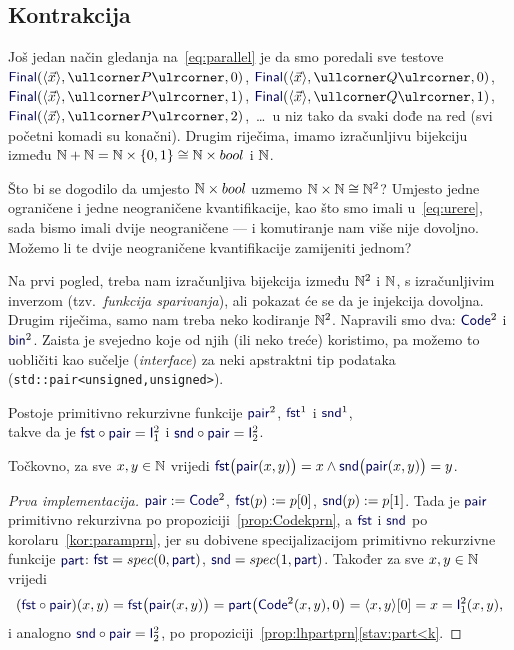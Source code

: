 \subsection{Kontrakcija}

Još jedan način gledanja na~\eqref{eq:parallel} je da smo poredali sve testove $\f{Final}(\kr{\vec x},\kprog P,0)$, $\f{Final}(\kr{\vec x},\kprog Q,0)$, $\f{Final}(\kr{\vec x},\kprog P,1)$, $\f{Final}(\kr{\vec x},\kprog Q,1)$,
$\f{Final}(\kr{\vec x},\kprog P,2)$,~\ldots\ u niz tako da svaki dođe na red (svi početni komadi su konačni). Drugim riječima, imamo izračunljivu bijekciju između ${\mathbb N}+{\mathbb N}={\mathbb N}\times\{0,1\}\cong{\mathbb N}\times bool$ i ${\mathbb N}$.

Što bi se dogodilo da umjesto ${\mathbb N}\times bool$ uzmemo ${\mathbb N}\times{\mathbb N}\cong{\mathbb N}^2$? Umjesto jedne ograničene i jedne neograničene kvantifikacije, kao što smo imali u~\eqref{eq:urere}, sada bismo imali dvije neograničene --- i komutiranje nam više nije dovoljno. Možemo li te dvije neograničene kvantifikacije zamijeniti jednom?

Na prvi pogled, treba nam izračunljiva bijekcija između ${\mathbb N}^2$ i ${\mathbb N}$, s izračunljivim inverzom (tzv.\ \emph{funkcija sparivanja}), ali pokazat će se da je injekcija dovoljna. Drugim riječima, samo nam treba neko kodiranje ${\mathbb N}^2$. Napravili smo dva: $\f{Code}^2$ i $\f{bin}^2$. Zaista je svejedno koje od njih (ili neko treće) koristimo, pa možemo to uobličiti kao sučelje (\emph{interface}) za neki apstraktni tip podataka (\texttt{std::pair<unsigned,unsigned>}).

\begin{lema}[{name=[primitivna rekurzivnost kodiranja i dekodiranja parova brojeva]}]\label{lm:pairfstsndprn}
Postoje primitivno rekurzivne funkcije $\f{pair}^2$, $\f{fst}^1$ i $\f{snd}^1$,\\ takve da je $\f{fst}\circ\f{pair}=\f I_1^2$ i $\f{snd}\circ\f{pair}=\f I_2^2$.
\end{lema}
Točkovno, za sve $x,y\in{\mathbb N}$ vrijedi $\f{fst}\bigl(\f{pair}(x,y)\bigr)=x\land\f{snd}\bigl(\f{pair}(x,y)\bigr)=y$.
\begin{proof}[Prva implementacija]
    $\f{pair}:=\f{Code}^2$, $\f{fst}(p):=p[0]$, $\f{snd}(p):=p[1]$. Tada je $\f{pair}$ primitivno rekurzivna po propoziciji~\ref{prop:Codekprn}, a $\f{fst}$ i $\f{snd}$ po korolaru~\ref{kor:paramprn}, jer su dobivene specijalizacijom primitivno rekurzivne funkcije $\f{part}$: $\f{fst}=spec(0,\f{part})$, $\f{snd}=spec(1,\f{part})$. Također za sve $x,y\in{\mathbb N}$ vrijedi
\begin{equation}
    (\f{fst}\circ\f{pair})(x,y)=\f{fst}\bigl(\f{pair}(x,y)\bigr)=\f{part}\bigl(\f{Code}^2(x,y),0\bigr)=\kr{x,y}[0]=x=\f I_1^2(x,y)\text,
\end{equation}
i analogno $\f{snd}\circ\f{pair}=\f I_2^2$, po propoziciji~\ref{prop:lhpartprn}\eqref{stav:part<k}.
\end{proof}

